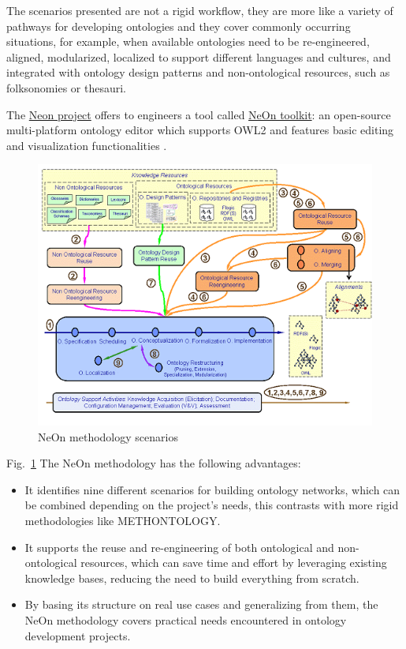 The scenarios presented are not a rigid workflow, they are more like a variety of pathways for developing ontologies and they cover commonly occurring situations, for example, when available ontologies need to be re-engineered, aligned, modularized, localized to support different languages and cultures, and integrated with ontology design patterns and non-ontological resources, such as folksonomies or thesauri\cite{suarez2011neon}.

The \href{http://neon-project.org/nw/Welcome_to_the_NeOn_Project.html}{Neon project} offers to engineers a tool called \href{http://neon-toolkit.org/wiki/Main_Page.html}{NeOn toolkit}: an open-source multi-platform ontology editor which supports OWL2 and features basic editing and visualization functionalities \cite{erdmann2011overview}.

\begin{figure}[H]
    \centering
    \includegraphics[width=0.5\linewidth]{Figures/fig_2.png}
    \caption{NeOn methodology scenarios}
    \label{fig:neon}
\end{figure}
Fig.~\ref{fig:neon}
The NeOn methodology has the following advantages:
\begin{itemize}
    \item It identifies nine different scenarios for building ontology networks, which can be combined depending on the project’s needs, this contrasts with more rigid methodologies like METHONTOLOGY.

    \item It supports the reuse and re-engineering of both ontological and non-ontological resources, which can save time and effort by leveraging existing knowledge bases, reducing the need to build everything from scratch.

    \item By basing its structure on real use cases and generalizing from them, the NeOn methodology covers practical needs encountered in ontology development projects.
\end{itemize}
